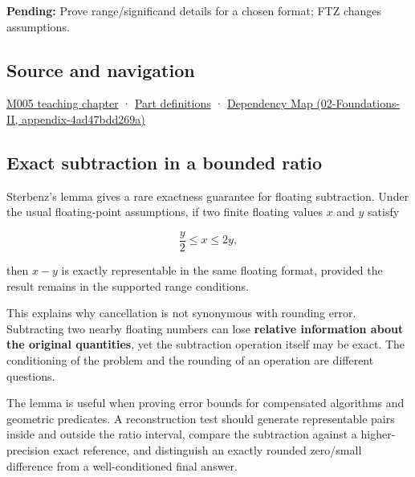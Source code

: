 \textbf{Pending:} Prove range/significand details for a chosen format; FTZ changes assumptions.

\subsection{Source and navigation}\label{appendix-399b7ad53f39-source-and-navigation}

\hyperref[01-foundations-i-ch001-when-arithmetic-meets-uncertainty]{M005 teaching chapter} · \hyperref[appendix-fd090d982a15-m005---parts-77-88]{Part definitions} · \href{../02-Foundations-II/main.pdf\#nameddest=appendix-4ad47bdd269a}{Dependency Map (02-Foundations-II, appendix-4ad47bdd269a)}

\subsection{Exact subtraction in a bounded ratio}\label{appendix-399b7ad53f39-exact-subtraction-in-a-bounded-ratio}

Sterbenz's lemma gives a rare exactness guarantee for floating subtraction. Under the usual floating-point assumptions, if two finite floating values \(x\) and \(y\) satisfy

\[
\frac{y}{2} \le x \le 2y,
\]

then \(x-y\) is exactly representable in the same floating format, provided the result remains in the supported range conditions.

This explains why cancellation is not synonymous with rounding error. Subtracting two nearby floating numbers can lose \textbf{relative information about the original quantities}, yet the subtraction operation itself may be exact. The conditioning of the problem and the rounding of an operation are different questions.

The lemma is useful when proving error bounds for compensated algorithms and geometric predicates. A reconstruction test should generate representable pairs inside and outside the ratio interval, compare the subtraction against a higher-precision exact reference, and distinguish an exactly rounded zero/small difference from a well-conditioned final answer.
